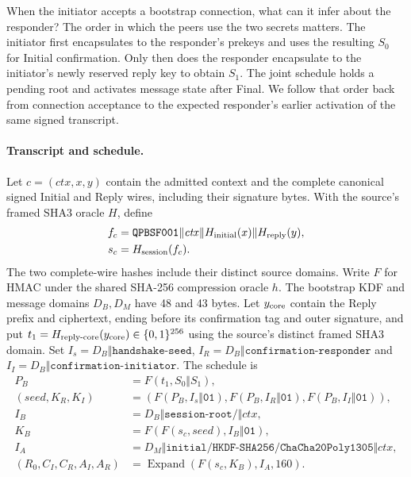 \documentclass[pdflatex]{sn-jnl}
\theoremstyle{thmstyleone}
\theoremstyle{thmstylethree}
\theoremstyle{thmstyletwo}
\begin{document}
When the initiator accepts a bootstrap connection, what can it infer
about the responder? The order in which the peers use the two secrets
matters. The initiator first encapsulates to the responder's prekeys
and uses the resulting $S_0$ for Initial confirmation. Only then does
the responder encapsulate to the initiator's newly reserved reply key
to obtain $S_1$. The joint schedule holds a pending root and activates
message state after Final. We follow that order back from connection
acceptance to the expected responder's earlier activation of the same
signed transcript.

\paragraph{Transcript and schedule.}
Let $c=(\mathit{ctx},x,y)$ contain the admitted context and the complete
canonical signed Initial and Reply wires, including their signature
bytes. With the source's framed SHA3 oracle $H$, define
\[
 \begin{split}
 f_c&=\mathtt{QPBSF001}\Vert\mathit{ctx}
       \Vert H_{\rm initial}(x)\Vert H_{\rm reply}(y),\\
 s_c&=H_{\rm session}(f_c).
 \end{split}
\]
The two complete-wire hashes include their distinct source domains.
Write $F$ for HMAC under the shared SHA-256 compression oracle $h$.
The bootstrap KDF and message domains $D_B,D_M$ have 48 and 43 bytes.
Let $y_{\rm core}$ contain the Reply prefix and ciphertext, ending before
its confirmation tag and outer signature, and put
$t_1=H_{\rm reply\text{-}core}(y_{\rm core})\in\{0,1\}^{256}$ using the
source's distinct framed SHA3 domain. Set
$I_s=D_B\Vert\texttt{handshake-seed}$,
$I_R=D_B\Vert\texttt{confirmation-responder}$ and
$I_I=D_B\Vert\texttt{confirmation-initiator}$.
The schedule is
\begin{equation}
 \begin{aligned}
 P_B&=F(t_1,S_0\Vert S_1),\\
 (\mathit{seed},K_R,K_I)&=
    (F(P_B,I_s\Vert\mathtt{01}),F(P_B,I_R\Vert\mathtt{01}),
       F(P_B,I_I\Vert\mathtt{01})),\\
 I_B&=D_B\Vert\texttt{session-root/}\Vert\mathit{ctx},\\
 K_B&=F(F(s_c,\mathit{seed}),I_B\Vert\mathtt{01}),\\
 I_A&=D_M\Vert\texttt{initial/HKDF-SHA256/ChaCha20Poly1305}
       \Vert\mathit{ctx},\\
 (R_0,C_I,C_R,A_I,A_R)&=
       \operatorname{Expand}(F(s_c,K_B),I_A,160).
 \end{aligned}
 \label{eq:bootstrap-schedule}
\end{equation}
\end{document}
